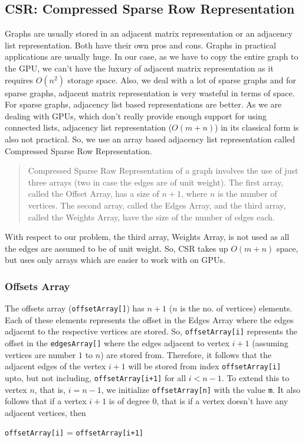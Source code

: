 \documentclass[MTech]{iitmdiss}
\begin{document}
\subsection{CSR: Compressed Sparse Row Representation}
Graphs are usually stored in an adjacent matrix representation or an adjacency list representation. Both have their own pros and cons. Graphs in practical applications are usually huge. In our case, as we have to copy the entire graph to the GPU, we can't have the luxury of adjacent matrix representation as it requires $O(n^{2})$ storage space. Also, we deal with a lot of sparse graphs and for sparse graphs, adjacent matrix representation is very wasteful in terms of space. For sparse graphs, adjacency list based representations are better. As we are dealing with GPUs, which don't really provide enough support for using connected lists, adjacency list representation ($O(m+n)$) in its classical form is also not practical. So, we use an array based adjacency list representation called Compressed Sparse Row Representation.
\begin{verse}
Compressed Sparse Raw Representation of a graph involves the use of just three arrays (two in case the edges are of unit weight). The first array, called the Offset Array, has a size of $n+1$, where $n$ is the number of vertices. The second array, called the Edges Array, and the third array, called the Weights Array, have the size of the number of edges each.
\end{verse}
With respect to our problem, the third array, Weights Array, is not used as all the edges are assumed to be of unit weight. So, CSR takes up $O(m+n)$ space, but uses only arrays which are easier to work with on GPUs.
\subsubsection{Offsets Array}
The offsets array (\verb+offsetArray[]+) has $n+1$ ($n$ is the no. of vertices) elements. Each of these elements represents the offset in the Edges Array where the edges adjacent to the respective vertices are stored. So, \verb+offsetArray[i]+ represents the offset in the \verb+edgesArray[]+ where the edges adjacent to vertex $i+1$ (assuming vertices are number $1$ to $n$) are stored from. Therefore, it follows that the adjacent edges of the vertex $i+1$ will be stored from index \verb+offsetArray[i]+ upto, but not including, \verb|offsetArray[i+1]| for all $i<n-1$. To extend this to vertex $n$, that is, $i = n-1$, we initialize \verb+offsetArray[n]+ with the value \verb+m+. It also follows that if a vertex $i+1$ is of degree 0, that is if a vertex doesn't have any adjacent vertices, then
\begin{center}
\verb+offsetArray[i]+ = \verb|offsetArray[i+1]|
\end{center}
\end{document}
